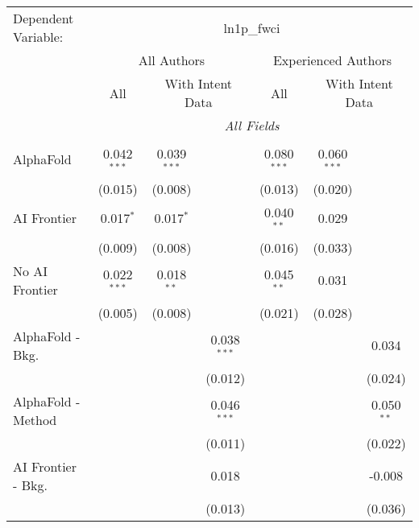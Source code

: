 \begingroup
\centering
\begin{tabular}{lcccccc}
   \tabularnewline \midrule \midrule
   Dependent Variable: & \multicolumn{6}{c}{ln1p\_fwci}\\
 & \multicolumn{3}{c}{All Authors} & \multicolumn{3}{c}{Experienced Authors} \\
\cmidrule(lr){2-4} \cmidrule(lr){5-7}
 & \multicolumn{1}{c}{All} & \multicolumn{2}{c}{With Intent Data} & \multicolumn{1}{c}{All} & \multicolumn{2}{c}{With Intent Data} \\
\cmidrule(lr){2-2} \cmidrule(lr){3-4} \cmidrule(lr){5-5} \cmidrule(lr){6-7}
 & \multicolumn{6}{c}{\textit{All Fields}} \\ \\
   AlphaFold               & 0.042$^{***}$ & 0.039$^{***}$ &               & 0.080$^{***}$ & 0.060$^{***}$ &   \\   
                           & (0.015)       & (0.008)       &               & (0.013)       & (0.020)       &   \\   
   AI Frontier             & 0.017$^{*}$   & 0.017$^{*}$   &               & 0.040$^{**}$  & 0.029         &   \\   
                           & (0.009)       & (0.008)       &               & (0.016)       & (0.033)       &   \\   
   No AI Frontier          & 0.022$^{***}$ & 0.018$^{**}$  &               & 0.045$^{**}$  & 0.031         &   \\   
                           & (0.005)       & (0.008)       &               & (0.021)       & (0.028)       &   \\   
   AlphaFold - Bkg.        &               &               & 0.038$^{***}$ &               &               & 0.034\\   
                           &               &               & (0.012)       &               &               & (0.024)\\   
   AlphaFold - Method      &               &               & 0.046$^{***}$ &               &               & 0.050$^{**}$\\   
                           &               &               & (0.011)       &               &               & (0.022)\\   
   AI Frontier - Bkg.      &               &               & 0.018         &               &               & -0.008\\   
                           &               &               & (0.013)       &               &               & (0.036)\\   

\end{tabular}
